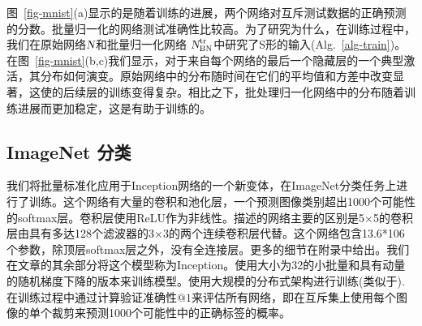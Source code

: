 \documentclass[twocolumn]{article}
\begin{document}
图~\ref{fig-mnist}(a)显示的是随着训练的进展，两个网络对互斥测试数据的正确预测的分数。批量归一化的网络测试准确性比较高。为了研究为什么，在训练过程中，我们在原始网络$\text{\sl N}$和批量归一化网络 $\text{\sl N}_\mathrm{BN}^\mathrm{tr}$中研究了S形的输入(Alg.~\ref{alg-train})。在图~\ref{fig-mnist}(b,c)我们显示，对于来自每个网络的最后一个隐藏层的一个典型激活，其分布如何演变。原始网络中的分布随时间在它们的平均值和方差中改变显著，这使的后续层的训练变得复杂。相比之下，批处理归一化网络中的分布随着训练进展而更加稳定，这是有助于训练的。

\subsection{ImageNet 分类}
\label{sec-results}

我们将批量标准化应用于Inception网络\cite{inception}的一个新变体，在ImageNet分类任务\cite{imagenet}上进行了训练。这个网络有大量的卷积和池化层，一个预测图像类别超出1000个可能性的softmax层。卷积层使用ReLU作为非线性。\cite{inception}描述的网络主要的区别是5×5的卷积层由具有多达128个滤波器的3×3的两个连续卷积层代替。这个网络包含13.6*106个参数，除顶层softmax层之外，没有全连接层。更多的细节在附录中给出。我们在文章的其余部分将这个模型称为Inception。使用大小为32的小批量和具有动量的随机梯度下降的版本来训练模型。使用大规模的分布式架构进行训练(类似于\cite{dist-belief}).在训练过程中通过计算验证准确性$@1$来评估所有网络，即在互斥集上使用每个图像的单个裁剪来预测1000个可能性中的正确标签的概率。
\end{document}
